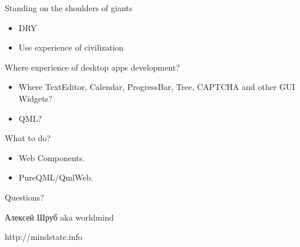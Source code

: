 \documentclass{beamer}
\begin{document}
\begin{frame}{Standing on the shoulders of giants}
  \begin{itemize}
  \item DRY
  \item Use experience of civilization
 \end{itemize}
\end{frame}

\begin{frame}{Where experience of desktop apps development?}
 \begin{itemize}
  \item Where TextEditor, Calendar, ProgressBar, Tree, CAPTCHA and other GUI Widgets?
  \pause
  \item QML? 
 \end{itemize}
\end{frame}

\begin{frame}{What to do?}
 \begin{itemize}
  \item Web Components.
  \pause
  \item PureQML/QmlWeb.
 \end{itemize}
\end{frame}

\begin{frame}{Questions?}
 \begin{center}
  Алексей Шруб aka worldmind
  
  http://mindstate.info
 \end{center}
\end{frame}
\end{document}

